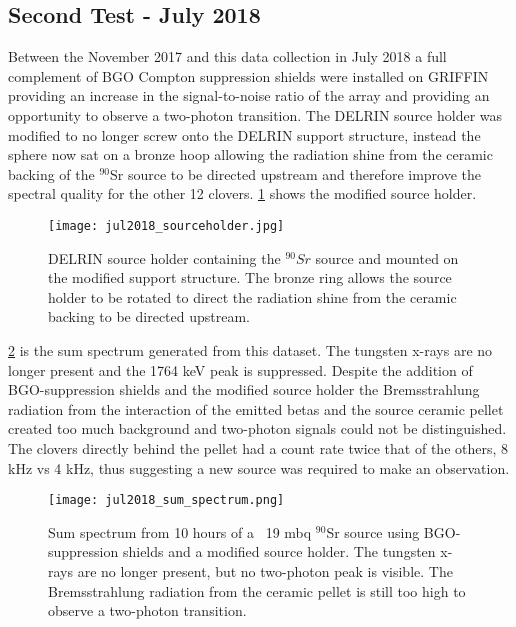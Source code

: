 \documentclass[cnatzke_thesis_proposal.tex]{subfiles}
\begin{document}
\subsection{Second Test - July 2018}
Between the November 2017 and this data collection in July 2018 a full complement of BGO Compton suppression shields were installed on GRIFFIN providing an increase in the signal-to-noise ratio of the array and providing an opportunity to observe a two-photon transition.
The DELRIN source holder was modified to no longer screw onto the DELRIN support structure, instead the sphere now sat on a bronze hoop allowing the radiation shine from the ceramic backing of the $^{90}$Sr source to be directed upstream and therefore improve the spectral quality for the other 12 clovers.
\ref{fig:source_holder_jul2018} shows the modified source holder.

\begin{figure}[htbp]
  \centering
  \texttt{[image: jul2018\_sourceholder.jpg]}
  \caption{DELRIN source holder containing the $^{90}Sr$ source and mounted on the modified support structure. The bronze ring allows the source holder to be rotated to direct the radiation shine from the ceramic backing to be directed upstream.}
  \label{fig:source_holder_jul2018}
\end{figure}

\ref{fig:sum_spectrum_jul2018} is the sum spectrum generated from this dataset. 
The tungsten x-rays are no longer present and the 1764 keV peak is suppressed. 
Despite the addition of BGO-suppression shields and the modified source holder the Bremsstrahlung radiation from the interaction of the emitted betas and the source ceramic pellet created too much background and two-photon signals could not be distinguished.
The clovers directly behind the pellet had a count rate twice that of the others, 8 kHz vs 4 kHz, thus suggesting a new source was required to make an observation.

\begin{figure}[htbp]
  \centering
  \texttt{[image: jul2018\_sum\_spectrum.png]}
  \caption{Sum spectrum from 10 hours of a ~19 mbq $^{90}$Sr source using BGO-suppression shields and a modified source holder. The tungsten x-rays are no longer present, but no two-photon peak is visible. The Bremsstrahlung radiation from the ceramic pellet is still too high to observe a two-photon transition.}
  \label{fig:sum_spectrum_jul2018}
\end{figure}
\end{document}
